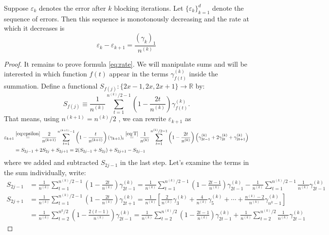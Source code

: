 \documentclass[11pt,english,a4paper]{article}
\begin{document}
\begin{prop}
Suppose $\varepsilon_k$ denotes the error after $k$ blocking iterations. Let $\{\varepsilon_k\}_{  k=1}^d$ denote the sequence of errors. Then this sequence is monotonously decreasing and the rate at which it decreases is
\begin{equation}
\varepsilon_k - \varepsilon_{  k+1} = \frac{(\gamma_k)_1 }{n^{(k)}} \label{eq:rate}
\end{equation}
\label{prop:diff}
\begin{proof}
It remains to prove formula \eqref{eq:rate}. We will manipulate sums and will be interested in which function $f(t)$ appear in the terms $\gamma^{(k)}_{f(t)}$ inside the summation. Define a functional $S_{f(j)} : \{2x-1,2x,2x+1\} \to \mathbb{R}$ by: 
\[S_{f(j)} \equiv \frac{1}{n^{(k)}} \sum_{t=1}^{n^{(k)}/2-1} \left( 1 - \frac{2t}{n^{(k)}} \right) \gamma^{(k)}_{f(t)}. \]
That means, using $n^{(k+1)} = n^{(k)}/2$ , we can rewrite $\varepsilon_{  k+1}$ as
\begin{align}
\varepsilon_{  k+1} &\stackrel{\eqref{eq:epsilon}}{=} \frac{2}{n^{(k+1)}} \sum_{t=1}^{n^{(k+1)}-1} \left( 1 - \frac{t}{n^{(k+1)}} \right) (\gamma_{k+1})_t \stackrel{\eqref{eq:T}}{=} \frac{1}{n^{(k)}} \sum_{t=1}^{n^{(k)}/2-1} \left( 1 - \frac{2t}{n^{(k)}} \right) \left( \gamma^{(k)}_{2t - 1} + 2\gamma^{(k)}_{2t} + \gamma^{(k)}_{2t + 1}\right) \nonumber \\
&= S_{2j-1} + 2S_{2j} + S_{2j+1} = 2(S_{2j-1} + S_{2j}) + S_{2j+1} - S_{2j-1} \label{eq:epsilonkpp}
\end{align}
where we added and subtracted $S_{2j - 1}$ in the last step. Let's examine the terms in the sum individually, write:
\begin{align}
S_{2j-1} &= \frac{1}{n^{(k)}} \sum_{t=1}^{n^{(k)}/2-1} \left( 1 - \frac{2t}{n^{(k)}} \right) \gamma^{(k)}_{2t - 1}  = \frac{1}{n^{(k)}}\sum_{t=1}^{n^{(k)}/2-1} \left( 1 - \frac{2t-1}{n^{(k)}}\right) \gamma^{(k)}_{2t - 1} - \frac{1}{n^{(k)}} \sum_{t=1}^{n^{(k)}/2-1} \frac{1}{n^{(k)}} \gamma^{(k)}_{2t - 1} \label{eq:sumB}
\\
S_{2j+1} &= \frac{1}{n^{(k)}} \sum_{t=1}^{n^{(k)}/2-1} \left( 1 - \frac{2t}{n^{(k)}} \right) \gamma^{(k)}_{2t + 1}  = \frac{1}{n^{(k)}} \left[ \frac{2}{n^{(k)}} \gamma^{(k)}_{3} + \frac{4}{n^{(k)}} \gamma^{(k)}_{5} + \cdots + \frac{n^{(k)} - 2}{n^{(k)}} \gamma^{(k)}_{n^{k} - 1}\right]\nonumber
 \\
 &= \frac{1}{n^{(k)}}\sum_{t=2}^{n^{k}/2} \left( 1 - \frac{2(t-1)}{n^{(k)}} \right) \gamma^{(k)}_{2t-1} = \frac{1}{n^{(k)}} \sum_{t=2}^{n^{(k)}/2} \left( 1 - \frac{2t-1}{n^{(k)}} \right) \gamma^{(k)}_{2t - 1} + \frac{1}{n^{(k)}}\sum_{t=2}^{n^{(k)}/2} \frac{1}{n^{(k)}} \gamma^{(k)}_{2t - 1}  \nonumber

\end{align}
\end{proof}
\end{prop}
\end{document}
